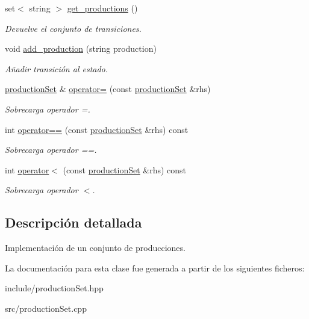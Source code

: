 \begin{DoxyCompactItemize}
\mbox{\label{classproduction_set_aa11c806944c2aedd344f48b99dae3909}} 
set$<$ string $>$ \mbox{\hyperlink{classproduction_set_aa11c806944c2aedd344f48b99dae3909}{get\+\_\+productions}} ()
\begin{DoxyCompactList}\small\item\em Devuelve el conjunto de transiciones. \end{DoxyCompactList}\item 
\mbox{\label{classproduction_set_ac85e72010ffaf536d66c465f51ed82e0}} 
void \mbox{\hyperlink{classproduction_set_ac85e72010ffaf536d66c465f51ed82e0}{add\+\_\+production}} (string production)
\begin{DoxyCompactList}\small\item\em Añadir transición al estado. \end{DoxyCompactList}\item 
\mbox{\label{classproduction_set_a733729272299767dc96b7c1f00a57405}} 
\mbox{\hyperlink{classproduction_set}{production\+Set}} \& \mbox{\hyperlink{classproduction_set_a733729272299767dc96b7c1f00a57405}{operator=}} (const \mbox{\hyperlink{classproduction_set}{production\+Set}} \&rhs)
\begin{DoxyCompactList}\small\item\em Sobrecarga operador =. \end{DoxyCompactList}\item 
\mbox{\label{classproduction_set_a076cffeb6ccd1b32756f6be16bb106f8}} 
int \mbox{\hyperlink{classproduction_set_a076cffeb6ccd1b32756f6be16bb106f8}{operator==}} (const \mbox{\hyperlink{classproduction_set}{production\+Set}} \&rhs) const
\begin{DoxyCompactList}\small\item\em Sobrecarga operador ==. \end{DoxyCompactList}\item 
\mbox{\label{classproduction_set_a114e5b417e44facba2aaab58466dd62d}} 
int \mbox{\hyperlink{classproduction_set_a114e5b417e44facba2aaab58466dd62d}{operator$<$}} (const \mbox{\hyperlink{classproduction_set}{production\+Set}} \&rhs) const
\begin{DoxyCompactList}\small\item\em Sobrecarga operador $<$. \end{DoxyCompactList}\end{DoxyCompactItemize}


\subsection{Descripción detallada}
Implementación de un conjunto de producciones. 

La documentación para esta clase fue generada a partir de los siguientes ficheros\+:\begin{DoxyCompactItemize}
\item 
include/production\+Set.\+hpp\item 
src/production\+Set.\+cpp\end{DoxyCompactItemize}
